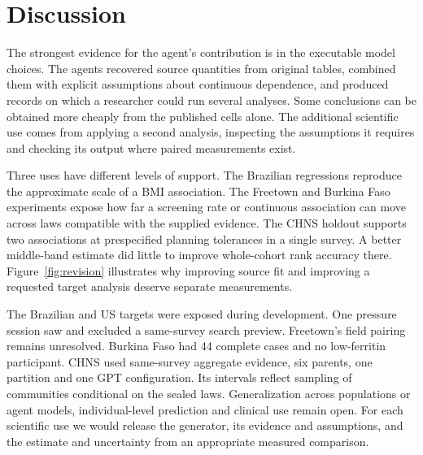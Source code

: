 \documentclass[sigconf,anonymous,review]{acmart}
\begin{document}
\section{Discussion}
The strongest evidence for the agent's contribution is in the executable model choices. The agents recovered source quantities from original tables, combined them with explicit assumptions about continuous dependence, and produced records on which a researcher could run several analyses. Some conclusions can be obtained more cheaply from the published cells alone. The additional scientific use comes from applying a second analysis, inspecting the assumptions it requires and checking its output where paired measurements exist.

Three uses have different levels of support. The Brazilian regressions reproduce the approximate scale of a BMI association. The Freetown and Burkina Faso experiments expose how far a screening rate or continuous association can move across laws compatible with the supplied evidence. The CHNS holdout supports two associations at prespecified planning tolerances in a single survey. A better middle-band estimate did little to improve whole-cohort rank accuracy there. Figure~\ref{fig:revision} illustrates why improving source fit and improving a requested target analysis deserve separate measurements.

The Brazilian and US targets were exposed during development. One pressure session saw and excluded a same-survey search preview. Freetown's field pairing remains unresolved. Burkina Faso had 44 complete cases and no low-ferritin participant. CHNS used same-survey aggregate evidence, six parents, one partition and one GPT configuration. Its intervals reflect sampling of communities conditional on the sealed laws. Generalization across populations or agent models, individual-level prediction and clinical use remain open. For each scientific use we would release the generator, its evidence and assumptions, and the estimate and uncertainty from an appropriate measured comparison.



\appendix

\end{document}
